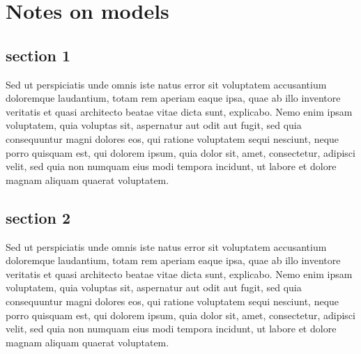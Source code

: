 \documentclass[a4paper, twoside, openright, 12pt]{report}
\newcommand*{\bibtitle}{Bibliography}
\theoremstyle{definition}
\theoremstyle{definition}
\theoremstyle{definition}
\theoremstyle{remark}
\begin{document}
\hypertarget{notes-on-models}{%
\chapter{Notes on models}\label{notes-on-models}}

\hypertarget{section-1-1}{%
\section{section 1}\label{section-1-1}}

Sed ut perspiciatis unde omnis iste natus error sit voluptatem accusantium doloremque laudantium, totam rem aperiam eaque ipsa, quae ab illo inventore veritatis et quasi architecto beatae vitae dicta sunt, explicabo. Nemo enim ipsam voluptatem, quia voluptas sit, aspernatur aut odit aut fugit, sed quia consequuntur magni dolores eos, qui ratione voluptatem sequi nesciunt, neque porro quisquam est, qui dolorem ipsum, quia dolor sit, amet, consectetur, adipisci velit, sed quia non numquam eius modi tempora incidunt, ut labore et dolore magnam aliquam quaerat voluptatem.

\hypertarget{section-2-1}{%
\section{section 2}\label{section-2-1}}

Sed ut perspiciatis unde omnis iste natus error sit voluptatem accusantium doloremque laudantium, totam rem aperiam eaque ipsa, quae ab illo inventore veritatis et quasi architecto beatae vitae dicta sunt, explicabo. Nemo enim ipsam voluptatem, quia voluptas sit, aspernatur aut odit aut fugit, sed quia consequuntur magni dolores eos, qui ratione voluptatem sequi nesciunt, neque porro quisquam est, qui dolorem ipsum, quia dolor sit, amet, consectetur, adipisci velit, sed quia non numquam eius modi tempora incidunt, ut labore et dolore magnam aliquam quaerat voluptatem.


\nocite{*}

\setlength{\baselineskip}{0pt} %

{\renewcommand*\MakeUppercase[1]{#1}%
\printbibliography[heading=bibintoc,title={\bibtitle}]}
\end{document}
